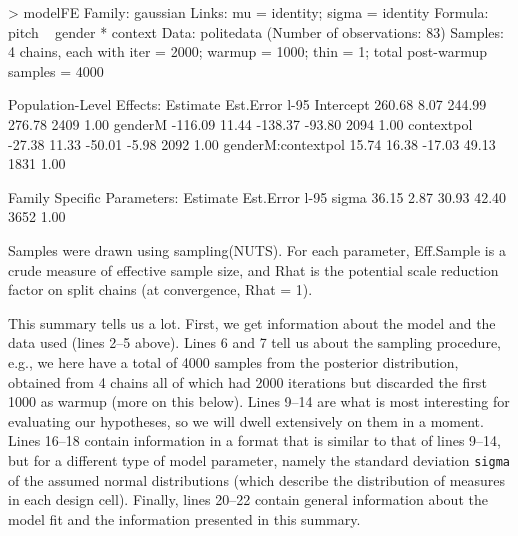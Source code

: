\documentclass[nobib]{tufte-handout}
\begin{document}
\begin{minipage}[]{1.2\textwidth}
\begin{rc}
> modelFE
 Family: gaussian 
  Links: mu = identity; sigma = identity 
Formula: pitch ~ gender * context 
   Data: politedata (Number of observations: 83) 
Samples: 4 chains, each with iter = 2000; warmup = 1000; thin = 1;
         total post-warmup samples = 4000

Population-Level Effects: 
                   Estimate Est.Error l-95%
Intercept            260.68      8.07   244.99   276.78       2409 1.00
genderM             -116.09     11.44  -138.37   -93.80       2094 1.00
contextpol           -27.38     11.33   -50.01    -5.98       2092 1.00
genderM:contextpol    15.74     16.38   -17.03    49.13       1831 1.00

Family Specific Parameters: 
      Estimate Est.Error l-95%
sigma    36.15      2.87    30.93    42.40       3652 1.00

Samples were drawn using sampling(NUTS). For each parameter, Eff.Sample 
is a crude measure of effective sample size, and Rhat is the potential 
scale reduction factor on split chains (at convergence, Rhat = 1).
\end{rc}
\end{minipage}

\medskip

This summary tells us a lot. First, we get information about the model and the data used (lines 2--5 above). Lines 6 and 7 tell us about the sampling procedure, e.g., we here have a total of 4000 samples from the posterior distribution, obtained from 4 chains all of which had 2000 iterations but discarded the first 1000 as warmup (more on this below). Lines 9--14 are what is most interesting for evaluating our hypotheses, so we will dwell extensively on them in a moment. Lines 16--18 contain information in a format that is similar to that of lines 9--14, but for a different type of model parameter, namely the standard deviation \texttt{sigma} of the assumed normal distributions (which describe the distribution of measures in each design cell). Finally, lines 20--22 contain general information about the model fit and the information presented in this summary.
\end{document}
